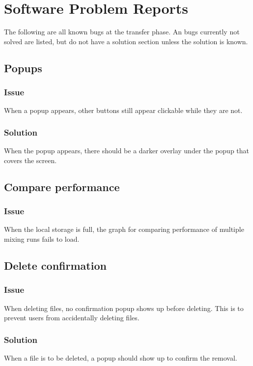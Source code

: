 \chapter{Software Problem Reports}
\label{chap:problems}

The following are all known bugs at the transfer phase. An bugs currently not solved are listed, but do not have a solution section unless the solution is known.

\section*{Popups}

\subsection*{Issue}
When a popup appears, other buttons still appear clickable while they are not.

\subsection*{Solution}
When the popup appears, there should be a darker overlay under the popup that covers the screen.

\section*{Compare performance}

\subsection*{Issue}
When the local storage is full, the graph for comparing performance of multiple mixing runs fails to load.

\section*{Delete confirmation}

\subsection*{Issue}
When deleting files, no confirmation popup shows up before deleting. This is to prevent users from accidentally deleting files.

\subsection*{Solution}
When a file is to be deleted, a popup should show up to confirm the removal.

